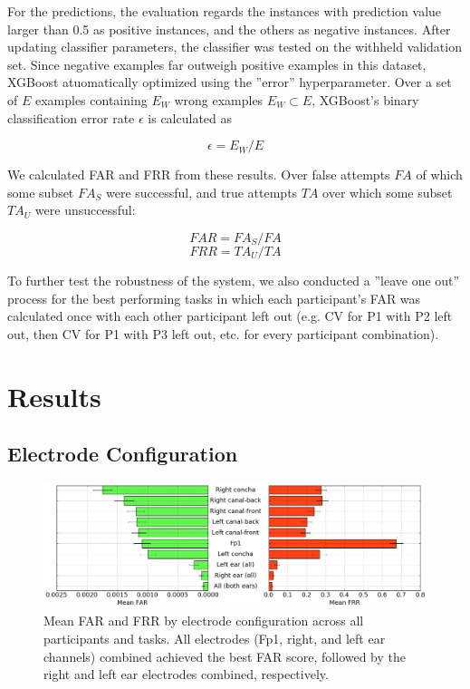 \documentclass{sigchi}
\begin{document}
For the predictions, the evaluation regards the instances with prediction value larger than 0.5 as positive instances, and the others as negative instances. After updating classifier parameters, the classifier was tested on the withheld validation set. Since negative examples far outweigh positive examples in this dataset, XGBoost atuomatically optimized using the ”error” hyperparameter. Over a set of \(E\) examples containing \(E_W\) wrong examples \(E_W\subset{E}\), XGBoost's binary classification error rate \(\epsilon\) is calculated as

\[ \epsilon = E_W / E \]

We calculated FAR and FRR from these results. Over false attempts \(FA\) of which some subset \(FA_S\) were successful, and true attempts \(TA\) over which some subset \(TA_U\) were unsuccessful:

\[ FAR = FA_S / FA \]
\[ FRR = TA_U / TA \]

To further test the robustness of the system, we also conducted a ”leave one out” process for the best performing tasks in which each participant’s FAR was calculated once with each other participant left out (e.g. CV for P1 with P2 left out, then CV for P1 with P3 left out, etc. for every participant combination).

\section{Results}
\subsection{Electrode Configuration}

\begin{figure}[t]
\centering
\includegraphics[width=.9\linewidth]{./figures/mean-far-and-frr-by-electrode-config.png}
\caption{Mean FAR and FRR by electrode configuration across all participants and tasks. All electrodes (Fp1, right, and left ear channels) combined achieved the best FAR score, followed by the right and left ear electrodes combined, respectively.}
\label{fig:meanByElectrode}
\end{figure}
\end{document}

